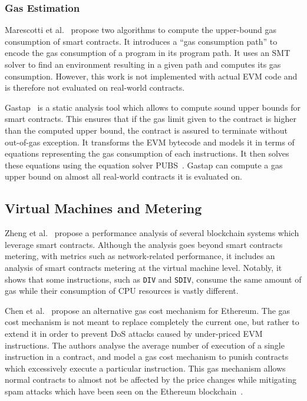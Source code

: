 \subsubsection*{Gas Estimation}
Marescotti et al.~\cite{10.1007/978-3-030-03427-6_33} propose two algorithms to compute the upper-bound gas consumption of smart contracts. It introduces a ``gas consumption path'' to encode the gas consumption of a program in its program path. It uses an SMT solver to find an environment resulting in a given path and computes its gas consumption. However, this work is not implemented with actual EVM code and is therefore not evaluated on real-world contracts.

Gastap~\cite{DBLP:journals/corr/abs-1811-10403} is a static analysis tool which allows to compute sound upper bounds for smart contracts.
This ensures that if the gas limit given to the contract is higher than the computed upper bound, the contract is assured to terminate without out-of-gas exception.
It transforms the EVM bytecode and models it in terms of equations representing the gas consumption of each instructions.
It then solves these equations using the equation solver PUBS~\cite{10.1007/978-3-540-69166-2_15}.
Gastap can compute a gas upper bound on almost all real-world contracts it is evaluated on.


\subsection{Virtual Machines and Metering}
Zheng et al.~\cite{8449244} propose a performance analysis of several blockchain systems which leverage smart contracts. Although the analysis goes beyond smart contracts metering, with metrics such as network-related performance, it includes an analysis of smart contracts metering at the virtual machine level. Notably, it shows that some instructions, such as \lstinline{DIV} and \lstinline{SDIV}, consume the same amount of gas while their consumption of CPU resources is vastly different.

Chen et al.~\cite{Chen2017Metering} propose an alternative gas cost mechanism for Ethereum. The gas cost mechanism is not meant to replace completely the current one, but rather to extend it in order to prevent DoS attacks caused by under-priced EVM instructions. The authors analyse the average number of execution of a single instruction in a contract, and model a gas cost mechanism to punish contracts which excessively execute a particular instruction. This gas mechanism allows normal contracts to almost not be affected by the price changes while mitigating spam attacks which have been seen on the Ethereum blockchain~\cite{transaction-spam-attack}.

